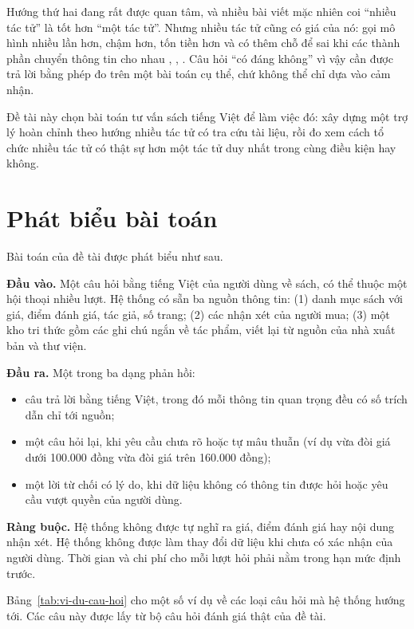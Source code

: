 Hướng thứ hai đang rất được quan tâm, và nhiều bài viết mặc nhiên coi ``nhiều tác tử'' là tốt hơn ``một tác tử''. Nhưng nhiều tác tử cũng có giá của nó: gọi mô hình nhiều lần hơn, chậm hơn, tốn tiền hơn và có thêm chỗ để sai khi các thành phần chuyển thông tin cho nhau , , . Câu hỏi ``có đáng không'' vì vậy cần được trả lời bằng phép đo trên một bài toán cụ thể, chứ không thể chỉ dựa vào cảm nhận.

Đề tài này chọn bài toán tư vấn sách tiếng Việt để làm việc đó: xây dựng một trợ lý hoàn chỉnh theo hướng nhiều tác tử có tra cứu tài liệu, rồi đo xem cách tổ chức nhiều tác tử có thật sự hơn một tác tử duy nhất trong cùng điều kiện hay không.

\section{Phát biểu bài toán}

Bài toán của đề tài được phát biểu như sau.

\textbf{Đầu vào.} Một câu hỏi bằng tiếng Việt của người dùng về sách, có thể thuộc một hội thoại nhiều lượt. Hệ thống có sẵn ba nguồn thông tin: (1) danh mục sách với giá, điểm đánh giá, tác giả, số trang; (2) các nhận xét của người mua; (3) một kho tri thức gồm các ghi chú ngắn về tác phẩm, viết lại từ nguồn của nhà xuất bản và thư viện.

\textbf{Đầu ra.} Một trong ba dạng phản hồi:
\begin{itemize}
    \item câu trả lời bằng tiếng Việt, trong đó mỗi thông tin quan trọng đều có số trích dẫn chỉ tới nguồn;
    \item một câu hỏi lại, khi yêu cầu chưa rõ hoặc tự mâu thuẫn (ví dụ vừa đòi giá dưới 100.000 đồng vừa đòi giá trên 160.000 đồng);
    \item một lời từ chối có lý do, khi dữ liệu không có thông tin được hỏi hoặc yêu cầu vượt quyền của người dùng.
\end{itemize}

\textbf{Ràng buộc.} Hệ thống không được tự nghĩ ra giá, điểm đánh giá hay nội dung nhận xét. Hệ thống không được làm thay đổi dữ liệu khi chưa có xác nhận của người dùng. Thời gian và chi phí cho mỗi lượt hỏi phải nằm trong hạn mức định trước.

Bảng~\ref{tab:vi-du-cau-hoi} cho một số ví dụ về các loại câu hỏi mà hệ thống hướng tới. Các câu này được lấy từ bộ câu hỏi đánh giá thật của đề tài.

